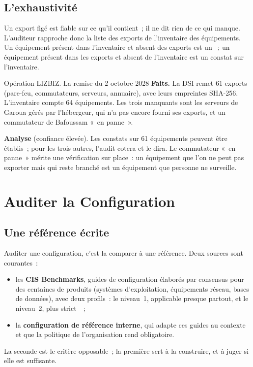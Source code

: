 \subsection{L'exhaustivité}

Un export figé est fiable sur ce qu'il contient~; il ne dit rien de ce qui
manque. L'auditeur rapproche donc la liste des exports de l'inventaire des
équipements. Un équipement présent dans l'inventaire et absent des
exports est un \NEK{}~; un équipement présent dans les exports et absent
de l'inventaire est un constat sur l'inventaire.

\begin{boxscenario}{Opération LIZBIZ. La remise du 2 octobre 2028}
\textbf{Faits.} La DSI remet 61 exports (pare-feu, commutateurs, serveurs,
annuaire), avec leurs empreintes SHA-256. L'inventaire compte 64
équipements. Les trois manquants sont les serveurs de Garoua gérés par
l'hébergeur, qui n'a pas encore fourni ses exports, et un commutateur de
Bafoussam «~en panne~».

\medskip
\textbf{Analyse} (confiance élevée). Les constats sur 61 équipements
peuvent être établis~; pour les trois autres, l'audit cotera \NEK{} et
le dira. Le commutateur «~en panne~» mérite une vérification sur place~: un
équipement que l'on ne peut pas exporter mais qui reste branché est un
équipement que personne ne surveille.
\end{boxscenario}

\section{Auditer la Configuration}
\label{sec:c12-configuration}

\subsection{Une référence écrite}

Auditer une configuration, c'est la comparer à une référence. Deux sources
sont courantes~:
\begin{itemize}
    \item les \textbf{CIS Benchmarks}, guides de configuration élaborés par
          consensus pour des centaines de produits (systèmes
          d'exploitation, équipements réseau, bases de données), avec deux
          profils~: le niveau~1, applicable presque partout, et le
          niveau~2, plus strict~\cite{cis2026benchmarks}~;
    \item la \textbf{configuration de référence interne}, qui adapte ces
          guides au contexte et que la politique de l'organisation rend
          obligatoire.
\end{itemize}
La seconde est le critère opposable~; la première sert à la construire, et
à juger si elle est suffisante.


